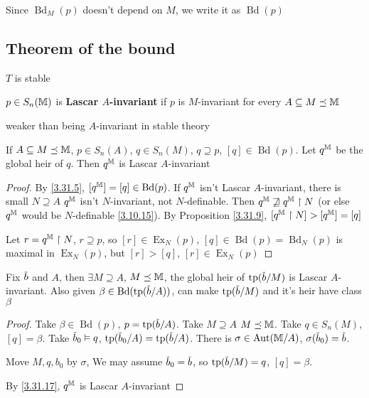 \documentclass[11pt]{article}
\DeclareMathOperator{\Ex}{Ex}
\DeclareMathOperator{\Bd}{Bd}
\begin{document}
Since \(\Bd_M(p)\) doesn't depend on \(M\), we write it as \(\Bd(p)\)
\subsection{Theorem of the bound}
\label{sec:orgeeeb357}
\(T\) is stable
\begin{definition}[]
\(p\in S_n(\mathbb{M})\) is \textbf{Lascar \(A\)-invariant} if \(p\) is \(M\)-invariant for every \(A\subseteq M\preceq\mathbb{M}\)
\end{definition}

weaker than being \(A\)-invariant in stable theory

\begin{lemma}[]
\label{3.31.17}
If \(A\subseteq M\preceq\mathbb{M}\), \(p\in S_n(A)\), \(q\in S_n(M)\), \(q\supseteq p\), \([q]\in\Bd(p)\). Let \(q^{\mathbb{M}}\) be the
global heir of \(q\). Then \(q^{\mathbb{M}}\) is Lascar \(A\)-invariant
\end{lemma}

\begin{proof}
By \ref{3.31.5}, \([q^{\M}]=[q]\in\Bd(p)\). If \(q^{\mathbb{M}}\) isn't Lascar \(A\)-invariant, there is
small \(N\supseteq A\) \(q^{\mathbb{M}}\) isn't \(N\)-invariant, not \(N\)-definable.
Then \(q^{\mathbb{M}}\not\sqsupseteq q^{\mathbb{M}}\upharpoonright N\) (or else \(q^{\mathbb{M}}\) would be \(N\)-definable \ref{3.10.15}). By Proposition \ref{3.31.9}, \([q^{\mathbb{M}}\upharpoonright N]>[q^{\mathbb{M}}]=[q]\)

Let \(r=q^{\mathbb{M}}\upharpoonright N\), \(r\supseteq p\), so \([r]\in\Ex_N(p)\), \([q]\in\Bd(p)=\Bd_N(p)\) is maximal
in \(\Ex_N(p)\), but \([r]>[q]\), \([r]\in\Ex_N(p)\)
\end{proof}

\begin{lemma}[]
\label{3.31.18}
Fix \(\barb\) and \(A\), then \(\exists M\supseteq A\), \(M\preceq\mathbb{M}\), the global heir of \(\tp(\barb/M)\) is
Lascar \(A\)-invariant. Also given \(\beta\in\Bd(\tp(\barb/A))\), can make \(\tp(\barb/M)\) and it's
heir have class \(\beta\)
\end{lemma}

\begin{proof}
Take \(\beta\in\Bd(p)\), \(p=\tp(\barb/A)\). Take \(M\supseteq A\) \(M\preceq\mathbb{M}\). Take \(q\in S_n(M)\), \([q]=\beta\).
Take \(\barb_0\vDash q\), \(\tp(\barb_0/A)=\tp(\barb/A)\). There
is \(\sigma\in\operatorname{\text{Aut}}(\mathbb{M}/A)\), \(\sigma(\barb_0)=\barb\).

Move \(M,q,b_0\) by \(\sigma\), We may assume \(\barb_0=\barb\), so \(\tp(\barb/M)=q\), \([q]=\beta\).

By \ref{3.31.17}, \(q^{\mathbb{M}}\) is Lascar \(A\)-invariant
\end{proof}
\end{document}
